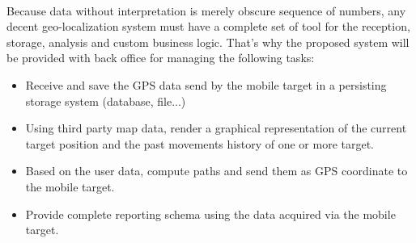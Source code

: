 \paragraph{}
Because data without interpretation is merely obscure sequence of numbers, any decent geo-localization system must have a complete set of tool for the reception, storage, analysis and custom business logic. That's why the proposed system will be provided with back office for managing the following tasks:
\begin{itemize}
\item Receive and save the GPS data send by the mobile target in a persisting storage system (database, file...)
\item Using third party map data, render a graphical representation of the current target position and the past movements history of one or more target.
\item Based on the user data, compute paths and send them as GPS coordinate to the mobile target.
\item Provide complete reporting schema using the data acquired via the mobile target.
\end{itemize}